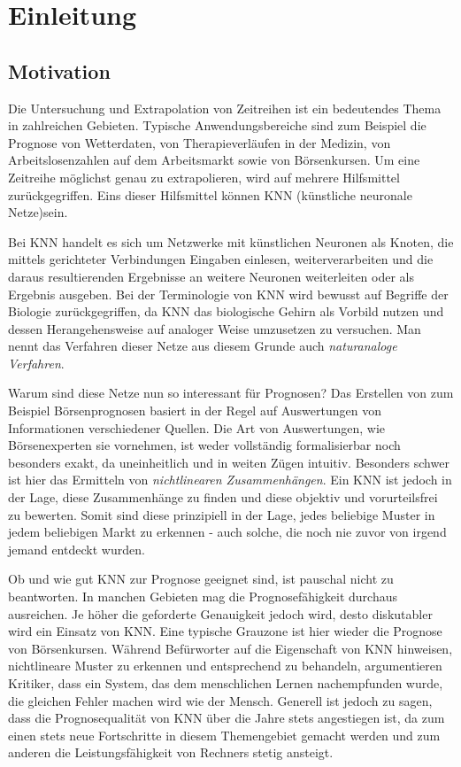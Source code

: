 \chapter{Einleitung}
\label{chapter:Einleitung}

\section{Motivation}
\label{section:Motivation}

Die Untersuchung und Extrapolation von Zeitreihen ist ein bedeutendes Thema in zahlreichen Gebieten. Typische Anwendungsbereiche sind zum Beispiel die Prognose von Wetterdaten, von Therapieverläufen in der  Medizin, von Arbeitslosenzahlen auf dem Arbeitsmarkt sowie von Börsenkursen. Um eine Zeitreihe möglichst genau zu extrapolieren, wird auf mehrere Hilfsmittel zurückgegriffen. Eins dieser Hilfsmittel können KNN (künstliche neuronale Netze)sein. 

Bei KNN handelt es sich um Netzwerke mit künstlichen Neuronen als Knoten, die mittels gerichteter Verbindungen Eingaben einlesen, weiterverarbeiten und die daraus resultierenden Ergebnisse an weitere Neuronen weiterleiten oder als Ergebnis ausgeben. Bei der Terminologie von KNN wird bewusst auf Begriffe der Biologie zurückgegriffen, da KNN das biologische Gehirn als Vorbild nutzen und dessen Herangehensweise auf analoger Weise umzusetzen zu versuchen. Man nennt das Verfahren dieser Netze aus diesem Grunde auch \textit{naturanaloge Verfahren}.

Warum sind diese Netze nun so interessant für Prognosen? Das Erstellen von zum Beispiel Börsenprognosen basiert in der Regel auf Auswertungen von Informationen verschiedener Quellen. Die Art von Auswertungen, wie Börsenexperten sie vornehmen, ist weder vollständig formalisierbar noch besonders exakt, da uneinheitlich und in weiten Zügen intuitiv. Besonders schwer ist hier das Ermitteln von \textit{nichtlinearen Zusammenhängen}. Ein KNN ist jedoch in der Lage, diese Zusammenhänge zu finden  und diese objektiv und vorurteilsfrei zu bewerten. Somit sind diese prinzipiell in der Lage, jedes beliebige Muster in jedem beliebigen Markt zu erkennen - auch solche, die noch nie zuvor von irgend jemand entdeckt wurden.

Ob und wie gut KNN zur Prognose geeignet sind, ist pauschal nicht zu beantworten. In manchen Gebieten mag die Prognosefähigkeit durchaus ausreichen. Je höher die geforderte Genauigkeit jedoch wird, desto diskutabler wird ein Einsatz von KNN. Eine typische Grauzone ist hier wieder die Prognose von Börsenkursen. Während Befürworter auf die Eigenschaft von KNN hinweisen, nichtlineare Muster zu erkennen und entsprechend zu behandeln, argumentieren Kritiker, dass ein System, das dem menschlichen Lernen nachempfunden wurde, die gleichen Fehler machen wird wie der Mensch. Generell ist jedoch zu sagen, dass die Prognosequalität von KNN über die Jahre stets angestiegen ist, da zum einen stets neue Fortschritte in diesem Themengebiet gemacht werden und zum anderen die Leistungsfähigkeit von Rechners stetig ansteigt. 

